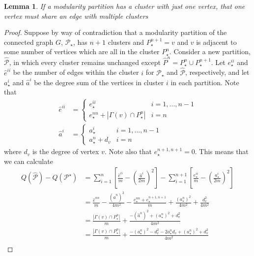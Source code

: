 \documentclass[]{article}
\newtheorem{lemma}[theorem]{Lemma}
\begin{document}
		\begin{lemma}
			 If a modularity partition has a cluster with just one vertex, that one vertex must share an edge with multiple clusters
		\end{lemma}
		\begin{proof}
			Suppose by way of contradiction that a modularity partition of the connected graph $G$, $\mathcal{P}_\star$, has $n+1$ clusters and $P_\star^{n+1}={v}$ and $v$ is adjacent to some number of vertices which are all in the cluster $P_\star^n$. Consider a new partition, $\hat{\mathcal{P}}$, in which every cluster remains unchanged except $\hat{P}^n= P_\star^n\cup P_\star^{n+1}$. Let $e^{ii}_\star$ and $\hat{e}^{ii}$ be the number of edges within the cluster $i$ for $\mathcal{P}_\star$ and $\hat{\mathcal{P}}$, respectively, and let $a^i_\star$ and $\hat{a}^i$ be the degree sum of the vertices in cluster $i$ in each partition. Note that
			\begin{equation}
				\begin{split}
					\hat{e}^{ii} &= \begin{cases}
						e^{ii}_\star & i=1,...,n-1\\
						 e^{nn}_\star + |\Gamma(v)\cap P_\star^{n}|& i=n
					\end{cases}\\
					\hat{a}^i &=\begin{cases}
						a^{i}_\star & i=1,...,n-1\\
						a_\star^n+d_{v}& i=n
					\end{cases}
				\end{split}
			\end{equation} 
			where $d_v$ is the degree of vertex $v$. Note also that $e_\star^{n+1,n+1}=0$. This means that we can calculate  \begin{equation}
				\begin{split}
					Q(\hat{\mathcal{P}})-Q(\mathcal{P}^\star)&= \sum_{i=1}^n \left[\frac{\hat e^{ii}}{m}-\left(\frac{\hat a^i}{2m}\right)^2\right]-\sum_{i=1}^{n+1}\left[ \frac{e_\star^{ii}}{m}-\left(\frac{a_\star^i}{2m}\right)^2\right]\\
					&=\frac{\hat{e}^{nn}}{m}-\frac{(\hat{a}^n)^2}{4m^2}-\frac{e_\star^{nn}+e_\star^{n+1,n+1}}{m}+\frac{(a^n_\star)^2}{4m^2}+\frac{d_v^2}{4m^2}\\
					&= \frac{|\Gamma(v)\cap P_\star^{n}|}{m}+\frac{-(\hat {a}^n)^2+(a^n_\star)^2+d_v^2}{4m^2}\\
					&= \frac{|\Gamma(v)\cap P_\star^{n}|}{m}+\frac{-(a^n_\star)^2-d_v^2-2a^n_\star d_v+(a^n_\star)^2+d_v^2}{4m^2}\\

\end{split}
\end{equation}
\end{proof}
\end{document}
